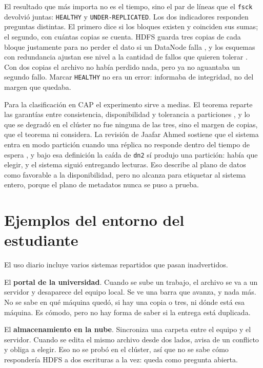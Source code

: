 \documentclass[12pt,a4paper]{article}
\begin{document}
El resultado que más importa no es el tiempo, sino el par de líneas que el \texttt{fsck} devolvió juntas: \texttt{HEALTHY} y \texttt{UNDER-REPLICATED}. Los dos indicadores responden preguntas distintas. El primero dice si los bloques existen y coinciden sus sumas; el segundo, con cuántas copias se cuenta. HDFS guarda tres copias de cada bloque justamente para no perder el dato si un DataNode falla \cite[p.~1]{tchaye2019hpf}, y los esquemas con redundancia ajustan ese nivel a la cantidad de fallos que quieren tolerar \cite[p.~1]{lei2024recovery}. Con dos copias el archivo no había perdido nada, pero ya no aguantaba un segundo fallo. Marcar \texttt{HEALTHY} no era un error: informaba de integridad, no del margen que quedaba.

Para la clasificación en CAP el experimento sirve a medias. El teorema reparte las garantías entre consistencia, disponibilidad y tolerancia a particiones \cite[p.~1]{anagnostakis2025new}, y lo que se degradó en el clúster no fue ninguna de las tres, sino el margen de copias, que el teorema ni considera. La revisión de Jaafar Ahmed sostiene que el sistema entra en modo partición cuando una réplica no responde dentro del tiempo de espera \cite[p.~172]{ahmed2023consistency}, y bajo esa definición la caída de \texttt{dn2} sí produjo una partición: había que elegir, y el sistema siguió entregando lecturas. Eso describe al plano de datos como favorable a la disponibilidad, pero no alcanza para etiquetar al sistema entero, porque el plano de metadatos nunca se puso a prueba.

\section{Ejemplos del entorno del estudiante}

El uso diario incluye varios sistemas repartidos que pasan inadvertidos.

El \textbf{portal de la universidad}. Cuando se sube un trabajo, el archivo se va a un servidor y desaparece del equipo local. Se ve una barra que avanza, y nada más. No se sabe en qué máquina quedó, si hay una copia o tres, ni dónde está esa máquina. Es cómodo, pero no hay forma de saber si la entrega está duplicada.

El \textbf{almacenamiento en la nube}. Sincroniza una carpeta entre el equipo y el servidor. Cuando se edita el mismo archivo desde dos lados, avisa de un conflicto y obliga a elegir. Eso no se probó en el clúster, así que no se sabe cómo respondería HDFS a dos escrituras a la vez: queda como pregunta abierta.
\end{document}
